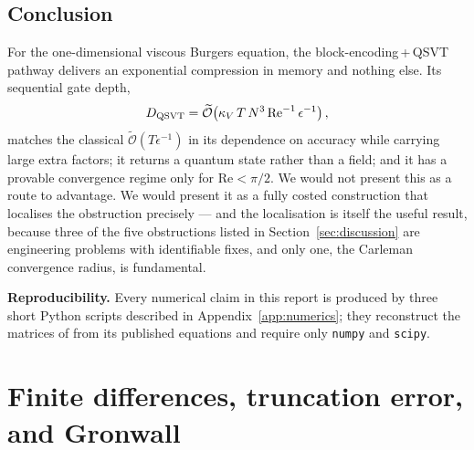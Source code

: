 \documentclass[11pt,a4paper]{article}
\theoremstyle{plain}
\theoremstyle{definition}
\theoremstyle{remark}
\newcommand{\Rey}{\mathrm{Re}}
\newcommand{\Ot}{\widetilde{\mathcal{O}}}
\begin{document}
\subsection{Conclusion}

For the one-dimensional viscous Burgers equation, the block-encoding\,+\,QSVT
pathway delivers an exponential compression in memory and nothing else.  Its
sequential gate depth,
\begin{equation*}
D_{\rm QSVT}=\Ot\!\left(\kappa_V\,T\,N^{3}\,\Rey^{-1}\,\epsilon^{-1}\right),
\end{equation*}
matches the classical $\Ot(T\epsilon^{-1})$ in its dependence on accuracy while
carrying large extra factors; it returns a quantum state rather than a field; and it
has a provable convergence regime only for $\Rey<\pi/2$.  We would not present
this as a route to advantage.  We would present it as a fully costed
construction that localises the obstruction precisely --- and the localisation
is itself the useful result, because three of the five obstructions listed in
Section~\ref{sec:discussion} are engineering problems with identifiable fixes,
and only one, the Carleman convergence radius, is fundamental.

\vspace{4mm}
\noindent\textbf{Reproducibility.}  Every numerical claim in this report is
produced by three short Python scripts described in
Appendix~\ref{app:numerics}; they reconstruct the matrices of \cite{Setty2026}
from its published equations and require only \texttt{numpy} and
\texttt{scipy}.

\appendix
\renewcommand{\thesection}{\Alph{section}}

\section{Finite differences, truncation error, and Gronwall}
\label{app:fd}
\end{document}
